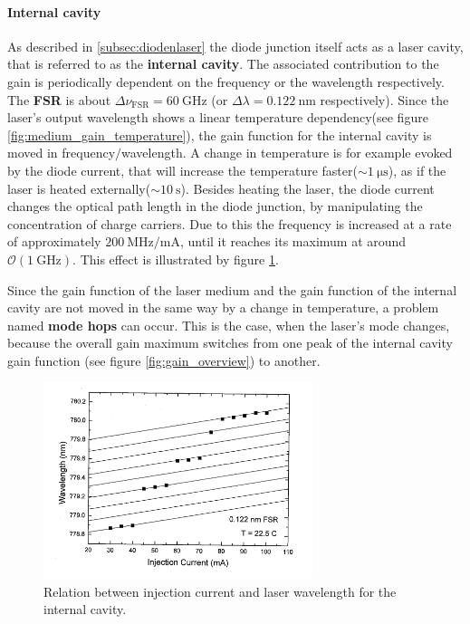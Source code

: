 \paragraph{Internal cavity}
As described in \ref{subsec:diodenlaser} the diode junction itself
acts as a laser cavity, that is referred to as the \textbf{internal cavity}.
The associated contribution to the gain is periodically dependent on
the frequency or the wavelength respectively. The \textbf{FSR} is about
$\Delta\nu_{\text{FSR}} = \SI{60}{\giga\hertz}$ (or
$\Delta\lambda = \SI{0.122}{\nano\meter}$ respectively).
Since the laser's output wavelength shows a linear
temperature dependency(see figure \ref{fig:medium_gain_temperature}),
the gain function for the internal cavity is moved in frequency$/$wavelength.
A change in temperature is for example evoked by the diode current,
that will increase the temperature faster($\sim \SI{1}{\micro\second}$),
as if the laser is heated externally($\sim \SI{10}{\second}$).
Besides heating the laser, the diode current changes the optical
path length in the diode junction, by manipulating the concentration
of charge carriers. Due to this the frequency is increased at a rate of
approximately $\SI{200}{\mega\hertz\per\milli\ampere}$, until it reaches
its maximum at around $\mathcal{O}(\SI{1}{\giga\hertz})$.
This effect is illustrated by figure \ref{fig:injectioncurrent_wavelength}.


Since the gain function of the laser medium and the gain function of
the internal cavity are not moved in the same way by a change in temperature,
a problem named \textbf{mode hops} can occur. This is the case,
when the laser's mode changes, because the overall gain maximum
switches from one peak of the internal cavity
gain function (see figure \ref{fig:gain_overview}) to another.


\FloatBarrier
\begin{figure}
  \centering
  \includegraphics[width=0.7\textwidth]{injectioncurrent_wavelength.png}
  \caption{Relation between injection current and laser wavelength for the internal cavity.\cite{V61}}
  \label{fig:injectioncurrent_wavelength}
\end{figure}
\FloatBarrier



